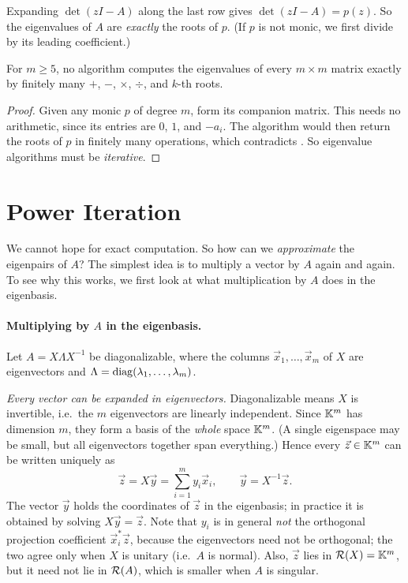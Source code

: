 Expanding $\det(zI - A)$ along the last row gives $\det(zI - A) = p(z)$. So the eigenvalues of $A$ are \emph{exactly} the roots of $p$. (If $p$ is not monic, we first divide by its leading coefficient.)

\begin{theorem}
  \label{thm:eig-iterative}
  For $m \ge 5$, no algorithm computes the eigenvalues of every $m \times m$ matrix exactly by finitely many $+$, $-$, $\times$, $\div$, and $k$-th roots.
\end{theorem}

\begin{proof}
  Given any monic $p$ of degree $m$, form its companion matrix. This needs no arithmetic, since its entries are $0$, $1$, and $-a_i$. The algorithm would then return the roots of $p$ in finitely many operations, which contradicts . So eigenvalue algorithms must be \emph{iterative}.
\end{proof}

\section{Power Iteration}

We cannot hope for exact computation. So how can we \emph{approximate} the eigenpairs of $A$? The simplest idea is to multiply a vector by $A$ again and again. To see why this works, we first look at what multiplication by $A$ does in the eigenbasis.

\paragraph{Multiplying by \texorpdfstring{$A$}{A} in the eigenbasis.} Let $A = X\Lambda X^{-1}$ be diagonalizable, where the columns $\vec{x}_1, \dots, \vec{x}_m$ of $X$ are eigenvectors and $\Lambda = \operatorname{diag}(\lambda_1, \dots, \lambda_m)$.

\emph{Every vector can be expanded in eigenvectors.} Diagonalizable means $X$ is invertible, i.e.\ the $m$ eigenvectors are linearly independent. Since $\mathbb{K}^m$ has dimension $m$, they form a basis of the \emph{whole} space $\mathbb{K}^m$. (A single eigenspace may be small, but all eigenvectors together span everything.) Hence every $\vec{z} \in \mathbb{K}^m$ can be written uniquely as
\begin{equation*}
  \vec{z} = X\vec{y} = \sum_{i=1}^m y_i\vec{x}_i, \qquad \vec{y} = X^{-1}\vec{z}.
\end{equation*}
The vector $\vec{y}$ holds the coordinates of $\vec{z}$ in the eigenbasis; in practice it is obtained by solving $X\vec{y} = \vec{z}$. Note that $y_i$ is in general \emph{not} the orthogonal projection coefficient $\vec{x}_i^\ast\vec{z}$, because the eigenvectors need not be orthogonal; the two agree only when $X$ is unitary (i.e.\ $A$ is normal). Also, $\vec{z}$ lies in $\mathcal{R}(X) = \mathbb{K}^m$, but it need not lie in $\mathcal{R}(A)$, which is smaller when $A$ is singular.

